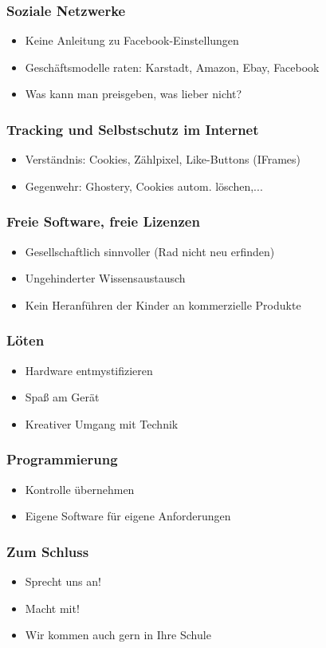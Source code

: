 \documentclass[12pt]{beamer}
\begin{document}
\begin{frame}
  \frametitle{Soziale Netzwerke}
  \begin{itemize}
    \item Keine Anleitung zu Facebook-Einstellungen
    \item Geschäftsmodelle raten: Karstadt, Amazon, Ebay, Facebook
    \item Was kann man preisgeben, was lieber nicht?
  \end{itemize}
\end{frame}

\begin{frame}
  \frametitle{Tracking und Selbstschutz im Internet}
  \begin{itemize}
    \item Verständnis: Cookies, Zählpixel, Like-Buttons (IFrames)
    \item Gegenwehr: Ghostery, Cookies autom. löschen,...
  \end{itemize}
\end{frame}

\begin{frame}
  \frametitle{Freie Software, freie Lizenzen}
  \begin{itemize}
    \item Gesellschaftlich sinnvoller (Rad nicht neu erfinden)
    \item Ungehinderter Wissensaustausch
    \item Kein Heranführen der Kinder an kommerzielle Produkte
  \end{itemize}
\end{frame}

\begin{frame}
  \frametitle{Löten}
  \begin{itemize}
    \item Hardware entmystifizieren
    \item Spaß am Gerät
    \item Kreativer Umgang mit Technik
  \end{itemize}
\end{frame}

\begin{frame}
  \frametitle{Programmierung}
  \begin{itemize}
    \item Kontrolle übernehmen
    \item Eigene Software für eigene Anforderungen
  \end{itemize}
\end{frame}

\begin{frame}
  \frametitle{Zum Schluss}
  \begin{itemize}
    \item Sprecht uns an!
    \item Macht mit!
    \item Wir kommen auch gern in Ihre Schule
  \end{itemize}
\end{frame}
\end{document}
